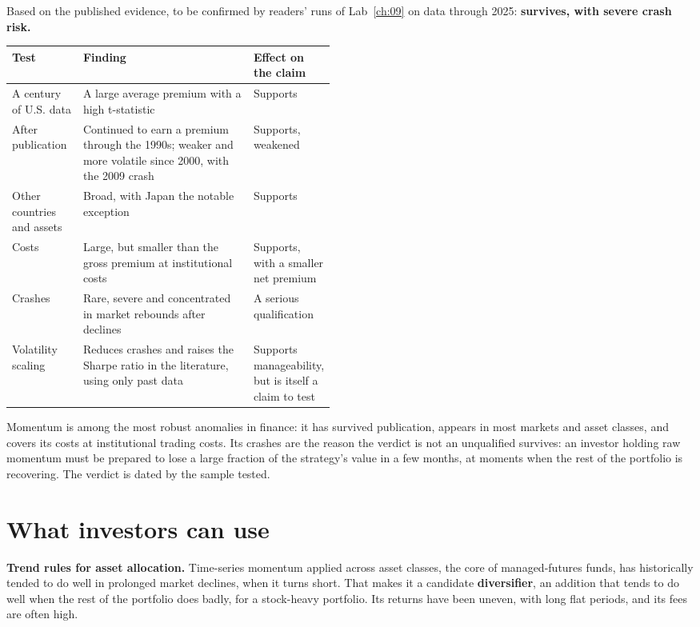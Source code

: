 Based on the published evidence, to be confirmed by readers' runs of Lab~\ref{ch:09} on data through 2025: \textbf{survives, with severe crash risk.}

\begin{center}
\small
\begin{tabularx}{0.9\linewidth}{@{}>{\raggedright\arraybackslash}p{0.22\linewidth}>{\raggedright\arraybackslash}X>{\raggedright\arraybackslash}p{0.25\linewidth}@{}}
\toprule
Test & Finding & Effect on the claim \\
\midrule
A century of U.S. data & A large average premium with a high t-statistic & Supports \\
After publication & Continued to earn a premium through the 1990s; weaker and more volatile since 2000, with the 2009 crash & Supports, weakened \\
Other countries and assets & Broad, with Japan the notable exception & Supports \\
Costs & Large, but smaller than the gross premium at institutional costs & Supports, with a smaller net premium \\
Crashes & Rare, severe and concentrated in market rebounds after declines & A serious qualification \\
Volatility scaling & Reduces crashes and raises the Sharpe ratio in the literature, using only past data & Supports manageability, but is itself a claim to test \\
\bottomrule
\end{tabularx}
\end{center}

Momentum is among the most robust anomalies in finance: it has survived publication, appears in most markets and asset classes, and covers its costs at institutional trading costs. Its crashes are the reason the verdict is not an unqualified survives: an investor holding raw momentum must be prepared to lose a large fraction of the strategy's value in a few months, at moments when the rest of the portfolio is recovering. The verdict is dated by the sample tested.

\section{What investors can use}
\label{sec:09-investors}

\textbf{Trend rules for asset allocation.} Time-series momentum applied across asset classes, the core of managed-futures funds, has historically tended to do well in prolonged market declines, when it turns short. That makes it a candidate \textbf{diversifier}, an addition that tends to do well when the rest of the portfolio does badly, for a stock-heavy portfolio. Its returns have been uneven, with long flat periods, and its fees are often high.


